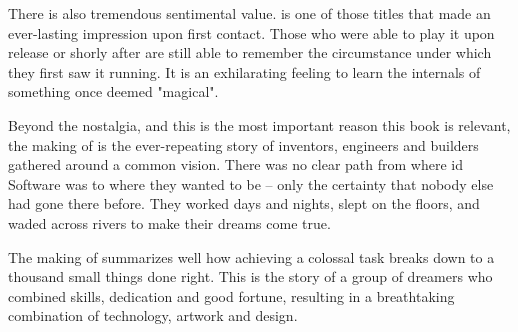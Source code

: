  \par
There is also tremendous sentimental value. \doom{} is one of those titles that made an ever-lasting impression upon first contact. Those who were able to play it upon release or shorly after are still able to remember the circumstance under which they first saw it running. It is an exhilarating feeling to learn the internals of something once deemed "magical".\\
\par


Beyond the nostalgia, and this is the most important reason this book is relevant, the making of \doom{} is the ever-repeating story of inventors, engineers and builders gathered around a common vision. There was no clear path from where id Software was to where they wanted to be -- only the certainty that nobody else had gone there before. They worked days and nights, slept on the floors, and waded across rivers to make their dreams come true.\\
\par
 The making of \doom{} summarizes well how achieving a colossal task breaks down to a thousand small things done right. This is the story of a group of dreamers who combined skills, dedication and good fortune, resulting in a breathtaking combination of technology, artwork and design.\\
\par



